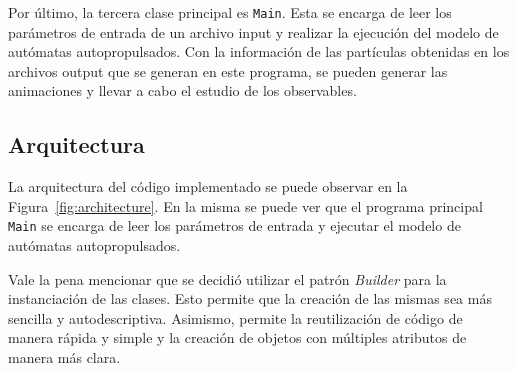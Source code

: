 \documentclass[11pt, a4paper]{article}
\begin{document}
        Por último, la tercera clase principal es \texttt{Main}.
        Esta se encarga de leer los parámetros de entrada de un archivo input y realizar la ejecución del modelo de
        autómatas autopropulsados.
        Con la información de las partículas obtenidas en los archivos output que se generan en este programa, se pueden generar las animaciones y llevar a cabo el estudio de los observables.

        \subsection{Arquitectura}
        \label{subsec:arquitectura}

            La arquitectura del código implementado se puede observar en la Figura~\ref{fig:architecture}.
            En la misma se puede ver que el programa principal \texttt{Main} se encarga de leer los parámetros de entrada
            y ejecutar el modelo de autómatas autopropulsados.

            Vale la pena mencionar que se decidió utilizar el patrón \textit{Builder} para la instanciación de las clases.
            Esto permite que la creación de las mismas sea más sencilla y autodescriptiva.
            Asimismo, permite la reutilización de código de manera rápida y simple y la creación de objetos con
            múltiples atributos de manera más clara.
\end{document}
